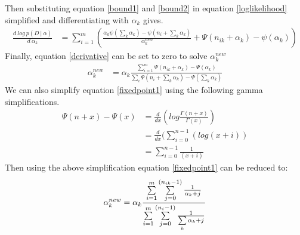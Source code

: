 \documentclass{article} %
\newcommand{\?}{\stackrel{?}{=}}
\begin{document}
Then substituting equation \ref{bound1} and \ref{bound2} in equation \ref{loglikelihood} simplified and differentiating with $\alpha_k$ gives.
\begin{align}
\frac{d\ log\ p(D\ |\ \alpha)}{d\ \alpha_k} &= 
\sum_{i=1}^{m} \left(\frac{\alpha_k{ \psi(\sum_{k}\alpha_k) - \psi(n_i+\sum_{k}\alpha_k)  }}{\alpha_{k}^{new}} +\Psi(n_{ik} + \alpha_k) - \psi(\alpha_k)\right)\label{derivative}
\end{align}
Finally, equation \ref{derivative} can be set to zero to solve $\alpha_{k}^{new}$
\begin{align}
\alpha_k^{new} &= \alpha_k \frac{\sum\limits_{i=1}^{m}\Psi(n_{ik}+\alpha_k)- \Psi(\alpha_k)}{\sum\limits_{i}\Psi(n_i +\sum\limits_k \alpha_k) - \Psi(\sum\limits_k \alpha_k)}\label{fixedpoint1}
\end{align}
We can also simplify equation \ref{fixedpoint1} using the following gamma simplifications.
\begin{align}
\Psi(n+x)-\Psi(x) &= \frac{d}{dx}(log\frac{ \Gamma(n+x)}{\Gamma(x)})\\
&=\frac{d}{dx}(\sum\limits_{i=0}^{n-1}( log (x+i))\\
&=\sum\limits_{i=0}^{n-1}\frac{1}{(x+i)}
\end{align}
Then using the above simplification equation \ref{fixedpoint1} can be reduced to:
\begin{align}
\alpha_k^{new} &= \alpha_k \frac{\sum\limits_{i=1}^{m}  \sum\limits_{j=0}^{(n_{ik}-1)}\frac{1}{\alpha_k +j}}{\sum\limits_{i=1}^{m}\sum\limits\limits_{j=0}^{(n_{i}-1)}\frac{1}{\sum\limits_k \alpha_k +j}}\\
\end{align}
\end{document}

